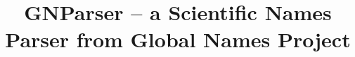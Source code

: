 \documentclass{bmcart}
\begin{document}
\begin{frontmatter}

\begin{fmbox}


\title{GNParser -- a Scientific Names Parser from Global Names Project }


\author[
   addressref={aff1},
   corref={aff1},                       %
   email={dmozzherin@gmail.com}
]{ }
\author[                  %
   noteref={n1},%
   email={alexander.myltsev@phystech.edu}   %
]{ }
\author[
   email={dpatterson.mbl@gmail.com}
]{ }


\address[id=aff1]{%
  ,    %
  ,                     %
  ,                         %
}


\end{fmbox}
\end{frontmatter}
\end{document}
